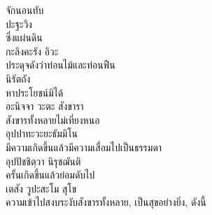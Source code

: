 \documentclass{article}
\begin{document}
\indent จักนอนทับ\\
ปะฐะวิง\\
\indent ซึ่งแผ่นดิน\\
กะลิงคะรัง อิวะ\\
\indent ประดุจดังว่าท่อนไม้และท่อนฟืน\\
นิรัตถัง\\
\indent หาประโยชน์มิได้\\
อะนิจจา วะตะ สังขารา\\
\indent สังขารทั้งหลายไม่เที่ยงหนอ\\
อุปปาทะวะยะธัมมิโน\\
\indent มีความเกิดขึ้นแล้วมีความเสื่อมไปเป็นธรรมดา\\
อุปปัชชิตฺวา นิรุชฌันติ\\
\indent ครั้นเกิดขึ้นแล้วย่อมดับไป\\
เตสัง วูปะสะโม สุโข\\
\indent ความเข้าไปสงบระงับสังขารทั้งหลาย, เป็นสุขอย่างยิ่ง, ดังนี้\\

\pagebreak
\end{document}
